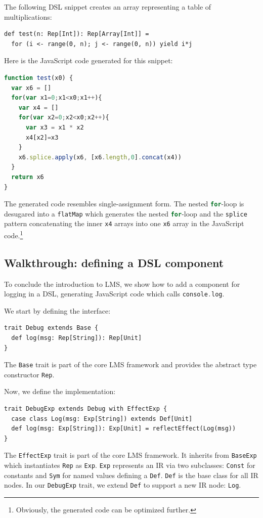 \documentclass{llncs}
\newcommand{\code}[1]{\lstinline[language=Scala,columns=fixed,basicstyle=\footnotesize]|#1|}
\begin{document}
The following DSL snippet creates an array representing a table of
multiplications:
\begin{lstlisting}
def test(n: Rep[Int]): Rep[Array[Int]] =
  for (i <- range(0, n); j <- range(0, n)) yield i*j
\end{lstlisting}

Here is the JavaScript code generated for this snippet:
\begin{lstlisting}[language=JavaScript]
function test(x0) {
  var x6 = []
  for(var x1=0;x1<x0;x1++){
    var x4 = []
    for(var x2=0;x2<x0;x2++){
      var x3 = x1 * x2
      x4[x2]=x3
    }
    x6.splice.apply(x6, [x6.length,0].concat(x4))
  }
  return x6
}
\end{lstlisting}

The generated code resembles single-assignment form. The nested
\code{for}-loop is desugared into a \code{flatMap} which generates the
nested \code{for}-loop and the \code{splice} pattern concatenating the
inner \code{x4} arrays into one \code{x6} array in the JavaScript
code.\footnote{Obviously, the generated code can be optimized further.}

\subsection{Walkthrough: defining a DSL component}\label{sec:defineDslComponent}

To conclude the introduction to LMS, we show how to add a component
for logging in a DSL, generating JavaScript code which calls
\code{console.log}.

We start by defining the interface:
\begin{lstlisting}
trait Debug extends Base {
  def log(msg: Rep[String]): Rep[Unit]
}
\end{lstlisting}

The \code{Base} trait is part of the core LMS framework and provides
the abstract type constructor \code{Rep}.

Now, we define the implementation:
\begin{lstlisting}
trait DebugExp extends Debug with EffectExp {
  case class Log(msg: Exp[String]) extends Def[Unit]
  def log(msg: Exp[String]): Exp[Unit] = reflectEffect(Log(msg))
}
\end{lstlisting}

The \code{EffectExp} trait is part of the core LMS framework. It
inherits from \code{BaseExp} which instantiates \code{Rep} as
\code{Exp}. \code{Exp} represents an IR via two subclasses:
\code{Const} for constants and \code{Sym} for named values defining a
\code{Def}. \code{Def} is the base class for all IR nodes. In our
\code{DebugExp} trait, we extend \code{Def} to support a new IR node:
\code{Log}.
\end{document}
